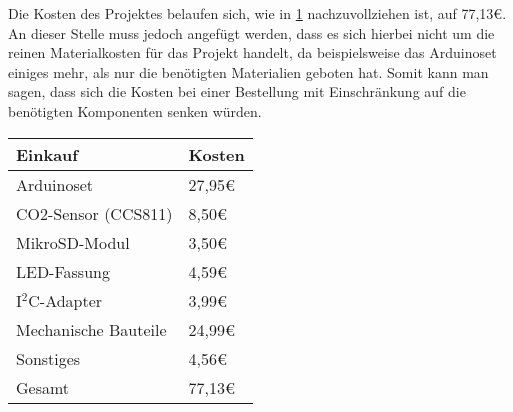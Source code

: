 \label{KostenundArbeitsplan}

Die Kosten des Projektes belaufen sich, wie in \ref{tab:Kosten} nachzuvollziehen ist, auf 77,13€. An dieser Stelle muss jedoch angefügt werden, dass es sich hierbei nicht um die reinen Materialkosten für das Projekt handelt, da beispielsweise das Arduinoset einiges mehr, als nur die benötigten Materialien geboten hat. Somit kann man sagen, dass sich die Kosten bei einer Bestellung mit Einschränkung auf die benötigten Komponenten senken würden. \\

\begin{table}[!hbt]
	
	\centering
	
	\begin{tabular}{|p{8cm}|p{8cm}|}
		
		\hline
		\rowcolor{lightgray} Einkauf & Kosten \\
		\hline
		Arduinoset & 27,95€ \\
		\hline
		CO2-Sensor (CCS811) & 8,50€ \\
		\hline
		MikroSD-Modul & 3,50€ \\
		\hline
		LED-Fassung & 4,59€ \\
		\hline
		I$^2$C-Adapter & 3,99€ \\
		\hline
		Mechanische Bauteile & 24,99€ \\
		\hline
		Sonstiges & 4,56€ \\
		\hline
		\rowcolor{lightgray} Gesamt & 77,13€ \\
		\hline
		
	\end{tabular}
	
	\label{tab:Kosten}
	
\end{table}

